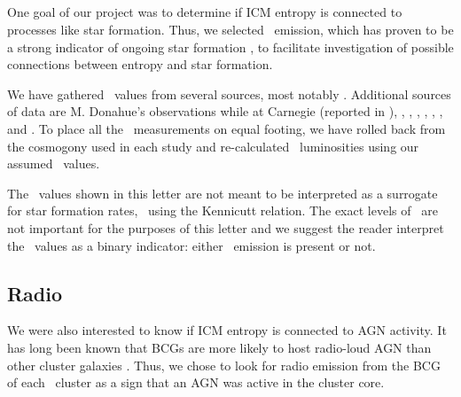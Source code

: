 \documentclass{emulateapj}
\begin{document}
\subsection{\halpha}
\label{sec:ha}

One goal of our project was to determine if ICM entropy is connected
to processes like star formation. Thus, we selected \halpha\ emission,
which has proven to be a strong indicator of ongoing star formation
\citep{kennicuttrelation}, to facilitate investigation of possible
connections between entropy and star formation.

We have gathered \halpha\ values from several sources, most notably
\cite{crawford99}. Additional sources of data are M. Donahue's
observations while at Carnegie (reported in \citealt{accept}),
\cite{heckman89}, \cite{dsg92}, \cite{lawrence96},
\cite{1996AJ....112.1390V}, \cite{white97},
\cite{2005MNRAS.363..216C}, and \cite{ir_quillen}. To place all the
\halpha\ measurements on equal footing, we have rolled back from the
cosmogony used in each study and re-calculated \halpha\ luminosities
using our assumed \LCDM\ values.

The \lha\ values shown in this letter are not meant to be interpreted
as a surrogate for star formation rates, \eg\ using the Kennicutt
relation. The exact levels of \lha\ are not important for the purposes
of this letter and we suggest the reader interpret the \lha\ values as
a binary indicator: either \halpha\ emission is present or not.

\subsection{Radio}
\label{sec:radio}

We were also interested to know if ICM entropy is connected to AGN
activity. It has long been known that BCGs are more likely to host
radio-loud AGN than other cluster galaxies \citep{burns81,
  valentijn83, burns90}. Thus, we chose to look for radio emission
from the BCG of each \accept\ cluster as a sign that an AGN was active
in the cluster core.
\end{document}

